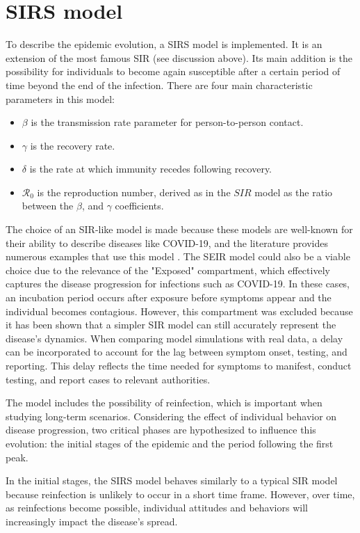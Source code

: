 \section{SIRS model}
\label{sec:SIRS}
To describe the epidemic evolution, a  SIRS model is implemented. It is an extension of the most famous SIR (see discussion above). Its main addition is the possibility for individuals to become again susceptible after a certain period of time beyond the end of the infection. There are four main characteristic parameters in this model:
\begin{itemize}
	\item $\beta$ is the transmission rate parameter for person-to-person
	contact.
	\item $\gamma$ is the recovery rate.
	\item  $\delta$ is the rate at which immunity recedes following recovery.
	\item  $\mathcal{R}_0$ is the reproduction number, derived as in the $SIR$ model as the ratio between the $\beta$, and $\gamma$ coefficients.
	
\end{itemize}
The choice of an SIR-like model is made because these models are well-known for their ability to describe diseases like COVID-19, and the literature provides numerous examples that use this model \cite{Dehning_2020, Li2022}. The SEIR model could also be a viable choice due to the relevance of the "Exposed" compartment, which effectively captures the disease progression for infections such as COVID-19. In these cases, an incubation period occurs after exposure before symptoms appear and the individual becomes contagious. However, this compartment was excluded because it has been shown \cite{Dehning_2020} that a simpler SIR model can still accurately represent the disease's dynamics. When comparing model simulations with real data, a delay can be incorporated to account for the lag between symptom onset, testing, and reporting. This delay reflects the time needed for symptoms to manifest, conduct testing, and report cases to relevant authorities.

The model includes the possibility of reinfection, which is important when studying long-term scenarios. Considering the effect of individual behavior on disease progression, two critical phases are hypothesized to influence this evolution: the initial stages of the epidemic and the period following the first peak.

In the initial stages, the SIRS model behaves similarly to a typical SIR model because reinfection is unlikely to occur in a short time frame. However, over time, as reinfections become possible, individual attitudes and behaviors will increasingly impact the disease's spread.

